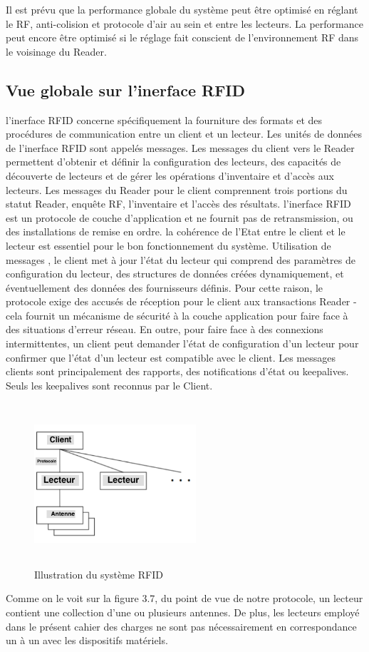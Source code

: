\documentclass[11pt, a4paper, twoside]{book}
\begin{document}
Il est prévu que la performance globale du système peut être optimisé en réglant le RF, anti-colision et protocole d'air  au sein et entre les lecteurs. La performance peut encore être optimisé si le réglage fait conscient de l'environnement RF dans le voisinage du Reader.\\
\subsection{Vue globale sur l'inerface RFID}
l'inerface RFID concerne spécifiquement la fourniture des formats et des procédures de communication entre un client et un lecteur. Les unités de données de l'inerface RFID sont appelés messages. Les messages du client vers le Reader permettent d'obtenir et définir la configuration des lecteurs, des capacités de découverte de lecteurs et de gérer les opérations d'inventaire et d'accès aux lecteurs. Les messages du Reader pour le client comprennent trois portions du statut Reader, enquête RF, l'inventaire et l'accès des résultats. l'inerface RFID est un protocole de couche d'application et ne fournit pas de retransmission, ou des installations de remise en ordre. la cohérence de l'Etat entre le client et le lecteur est essentiel pour le bon fonctionnement du système. Utilisation de messages , le client met à jour l'état du lecteur qui comprend des paramètres de configuration du lecteur, des structures de données créées dynamiquement, et éventuellement des données des fournisseurs définis. Pour cette raison, le protocole exige des accusés de réception pour le client aux transactions Reader - cela fournit un mécanisme de sécurité à la couche application pour faire face à des situations d'erreur réseau. En outre, pour faire face à des connexions intermittentes, un client peut demander l'état de configuration d'un lecteur pour confirmer que l'état d'un lecteur est compatible avec le client. Les messages clients sont principalement des rapports, des notifications d'état ou keepalives. Seuls les keepalives sont reconnus par le Client.
\begin{figure}[H]
\centering
\includegraphics[width=6cm,height=6cm]{lim}
\caption{Illustration du système RFID}
\end{figure}
Comme on le voit sur la figure 3.7, du point de vue de notre protocole, un lecteur contient une collection d'une ou
plusieurs antennes. De plus, les lecteurs employé dans le présent cahier des charges ne sont pas nécessairement en
correspondance un à un avec les dispositifs matériels.
\end{document}
